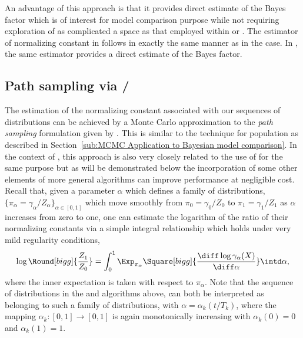 

An advantage of this approach is that it provides direct estimate of the Bayes
factor which is of interest for model comparison purpose while not requiring
exploration of as complicated a space as that employed within \rjmcmc or
\smc[1]. The estimator of normalizing constant in \smc[3] follows in
exactly the same manner as in the \smc[2] case. In \smc[3], the same estimator
provides a direct estimate of the Bayes factor.

\subsection{Path sampling via \smc[2]/\smc[3]}
\label{sub:Path Sampling via smc2/smc3}

The estimation of the normalizing constant associated with our sequences of
distributions can be achieved by a Monte Carlo approximation to the \emph{path
  sampling} formulation given by \cite{Gelman:1998ei}. This is similar to the
technique for population \mcmc as described in Section~\ref{sub:MCMC
  Application to Bayesian model comparison}. In the context of \smc, this
approach is also very closely related to the use of \ais for the same purpose
\cite{Neal:2001we} but as will be demonstrated below the incorporation of some
other elements of more general \smc algorithms can improve performance at
negligible cost. Recall that, given a parameter $\alpha$ which defines a
family of distributions, $\{\pi_{\alpha} = \gamma_{\alpha} / Z_\alpha\}_{\alpha \in
  [0,1]}$ which move smoothly from $\pi_0 = \gamma_0 / Z_0$ to $\pi_1 =
\gamma_1 / Z_1$ as $\alpha$ increases from zero to one, one can estimate the
logarithm of the ratio of their normalizing constants via a simple integral
relationship which holds under very mild regularity conditions,
\begin{equation*}
  \log\Round[bigg]{\frac{Z_1}{Z_0}} =
  \int_{0}^{1} \Exp_{\pi_\alpha} \Square[bigg]{
    \frac{\diff\log\gamma_{\alpha}(X)}{\diff\alpha}
  } \intd\alpha,
\end{equation*}
where the inner expectation is taken with respect to $\pi_{\alpha}$. Note that
the sequence of distributions in the \smc[2] and \smc[3] algorithms above, can
both be interpreted as belonging to such a family of distributions, with
$\alpha = \alpha_k(t/T_k)$, where the mapping $\alpha_k:[0,1]\to[0,1]$ is
again monotonically increasing with $\alpha_k(0) = 0$ and $\alpha_k(1) = 1$.

